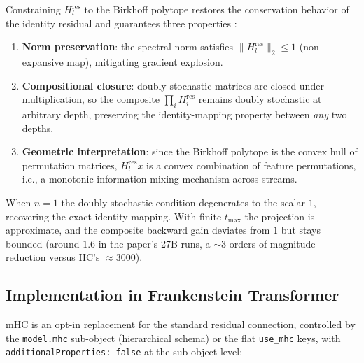 Constraining $H^{\text{res}}_l$ to the Birkhoff polytope restores the
conservation behavior of the identity residual and guarantees three properties
\citep{xie_mhc_2025}:
\begin{enumerate}[leftmargin=*]
    \item \textbf{Norm preservation}: the spectral norm satisfies
        $\|H^{\text{res}}_l\|_2 \le 1$ (non-expansive map), mitigating
        gradient explosion.
    \item \textbf{Compositional closure}: doubly stochastic matrices are
        closed under multiplication, so the composite
        $\prod_i H^{\text{res}}_{i}$ remains doubly stochastic at arbitrary
        depth, preserving the identity-mapping property between \emph{any} two
        depths.
    \item \textbf{Geometric interpretation}: since the Birkhoff polytope is
        the convex hull of permutation matrices, $H^{\text{res}}_l x$ is a
        convex combination of feature permutations, i.e., a monotonic
        information-mixing mechanism across streams.
\end{enumerate}
When $n = 1$ the doubly stochastic condition degenerates to the scalar $1$,
recovering the exact identity mapping. With finite $t_{\max}$ the projection is
approximate, and the composite backward gain deviates from $1$ but stays
bounded (around $1.6$ in the paper's 27B runs, a $\sim3$-orders-of-magnitude
reduction versus HC's $\approx 3000$).

\subsection{Implementation in Frankenstein Transformer}

mHC is an opt-in replacement for the standard residual connection, controlled
by the \texttt{model.mhc} sub-object (hierarchical schema) or the flat
\texttt{use\_mhc} keys, with \texttt{additionalProperties: false} at the
sub-object level:

